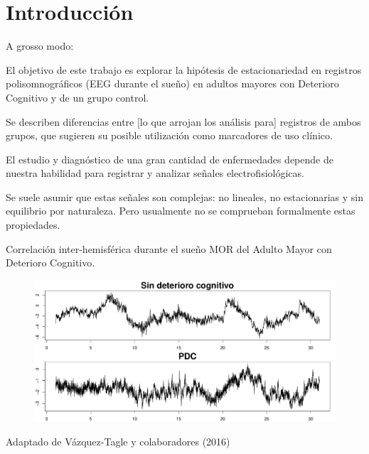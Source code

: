 \chapter*{Introducci\'on}

A grosso modo:

El objetivo de este trabajo es explorar la hip\'otesis de estacionariedad en registros
polisomnogr\'aficos (EEG durante el sue\~no) en adultos mayores con Deterioro Cognitivo y de
un grupo control.

Se describen diferencias entre [lo que arrojan los an\'alisis para] registros de ambos grupos, 
que sugieren su posible utilizaci\'on 
como marcadores de uso cl\'inico.

El estudio y diagnóstico de una gran cantidad de enfermedades depende de nuestra habilidad para
registrar y analizar se\~nales electrofisiol\'ogicas. 

Se suele asumir que estas se\~nales son complejas: no lineales, no estacionarias y sin equilibrio 
por naturaleza. Pero usualmente no se comprueban formalmente estas propiedades.

Correlaci\'on inter-hemisf\'erica durante el sueño MOR del Adulto Mayor con Deterioro Cognitivo.

\begin{figure}[h]
\centering
\includegraphics[width=.8\linewidth]{graficaintro.pdf}
\end{figure}

Adaptado de V\'azquez-Tagle y colaboradores (2016)


